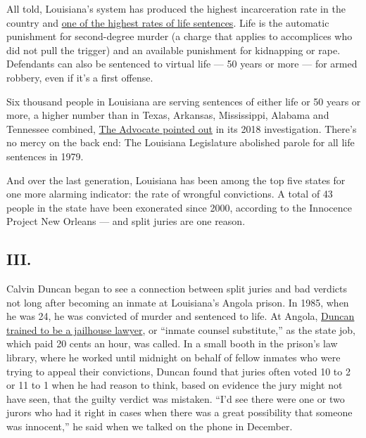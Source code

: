 All told, Louisiana's system has produced the highest incarceration rate
in the country and
\href{https://www.theadvocate.com/baton_rouge/news/article_f6309822-17ac-11ea-8750-f7d212aa28f8.html}{one
of the highest rates of life sentences}. Life is the automatic
punishment for second-degree murder (a charge that applies to
accomplices who did not pull the trigger) and an available punishment
for kidnapping or rape. Defendants can also be sentenced to virtual life
--- 50 years or more --- for armed robbery, even if it's a first
offense.

Six thousand people in Louisiana are serving sentences of either life or
50 years or more, a higher number than in Texas, Arkansas, Mississippi,
Alabama and Tennessee combined,
\href{https://www.theadvocate.com/baton_rouge/news/article_f6309822-17ac-11ea-8750-f7d212aa28f8.html}{The
Advocate pointed out} in its 2018 investigation. There's no mercy on the
back end: The Louisiana Legislature abolished parole for all life
sentences in 1979.

And over the last generation, Louisiana has been among the top five
states for one more alarming indicator: the rate of wrongful
convictions. A total of 43 people in the state have been exonerated
since 2000, according to the Innocence Project New Orleans --- and split
juries are one reason.

\hypertarget{iii}{%
\subsection{III.}\label{iii}}

Calvin Duncan began to see a connection between split juries and bad
verdicts not long after becoming an inmate at Louisiana's Angola prison.
In 1985, when he was 24, he was convicted of murder and sentenced to
life. At Angola,
\href{https://www.nytimes3xbfgragh.onion/2019/08/05/us/politics/supreme-court-nonunanimous-juries.html}{Duncan
trained to be a jailhouse lawyer}, or ``inmate counsel substitute,'' as
the state job, which paid 20 cents an hour, was called. In a small booth
in the prison's law library, where he worked until midnight on behalf of
fellow inmates who were trying to appeal their convictions, Duncan found
that juries often voted 10 to 2 or 11 to 1 when he had reason to think,
based on evidence the jury might not have seen, that the guilty verdict
was mistaken. ``I'd see there were one or two jurors who had it right in
cases when there was a great possibility that someone was innocent,'' he
said when we talked on the phone in December.

